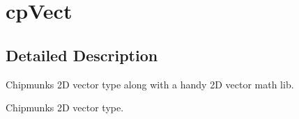 \hypertarget{group__cpVect}{}\section{cp\+Vect}
\label{group__cpVect}


\subsection{Detailed Description}
Chipmunk\textquotesingle{}s 2D vector type along with a handy 2D vector math lib.

Chipmunk\textquotesingle{}s 2D vector type. 